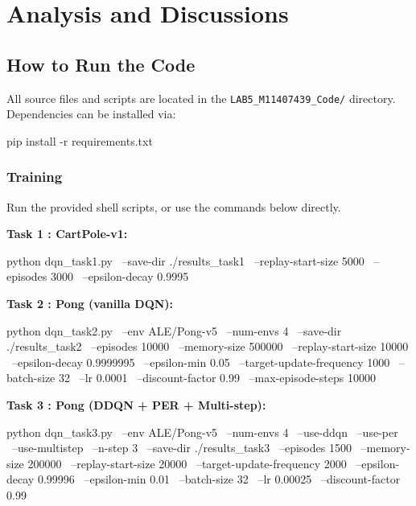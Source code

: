 \documentclass[12pt,a4paper]{report}
\begin{document}
\chapter{Analysis and Discussions}

\section{How to Run the Code}

All source files and scripts are located in the \texttt{LAB5\_M11407439\_Code/} directory.
Dependencies can be installed via:

\begin{pycode}
pip install -r requirements.txt
\end{pycode}

\subsection{Training}

Run the provided shell scripts, or use the commands below directly.

\vspace{0.2cm}

\textbf{Task 1 : CartPole-v1:}
\begin{pycode}
python dqn_task1.py \
  --save-dir ./results_task1 \
  --replay-start-size 5000 \
  --episodes 3000 \
  --epsilon-decay 0.9995
\end{pycode}

\textbf{Task 2 : Pong (vanilla DQN):}
\begin{pycode}
python dqn_task2.py \
  --env ALE/Pong-v5 \
  --num-envs 4 \
  --save-dir ./results_task2 \
  --episodes 10000 \
  --memory-size 500000 \
  --replay-start-size 10000 \
  --epsilon-decay 0.9999995 \
  --epsilon-min 0.05 \
  --target-update-frequency 1000 \
  --batch-size 32 \
  --lr 0.0001 \
  --discount-factor 0.99 \
  --max-episode-steps 10000
\end{pycode}

\textbf{Task 3 : Pong (DDQN + PER + Multi-step):}
\begin{pycode}
python dqn_task3.py \
  --env ALE/Pong-v5 \
  --num-envs 4 \
  --use-ddqn \
  --use-per \
  --use-multistep \
  --n-step 3 \
  --save-dir ./results_task3 \
  --episodes 1500 \
  --memory-size 200000 \
  --replay-start-size 20000 \
  --target-update-frequency 2000 \
  --epsilon-decay 0.99996 \
  --epsilon-min 0.01 \
  --batch-size 32 \
  --lr 0.00025 \
  --discount-factor 0.99
\end{pycode}
\end{document}
